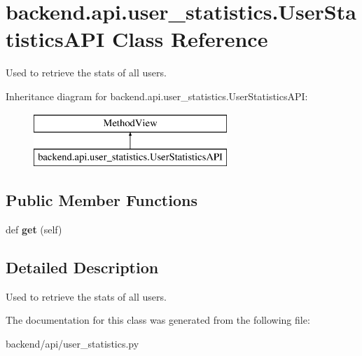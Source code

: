 \hypertarget{classbackend_1_1api_1_1user__statistics_1_1_user_statistics_a_p_i}{}\section{backend.\+api.\+user\+\_\+statistics.\+User\+Statistics\+A\+P\+I Class Reference}
\label{classbackend_1_1api_1_1user__statistics_1_1_user_statistics_a_p_i}


Used to retrieve the stats of all users.  


Inheritance diagram for backend.\+api.\+user\+\_\+statistics.\+User\+Statistics\+A\+P\+I\+:\begin{figure}[H]
\begin{center}
\leavevmode
\includegraphics[height=2.000000cm]{classbackend_1_1api_1_1user__statistics_1_1_user_statistics_a_p_i}
\end{center}
\end{figure}
\subsection*{Public Member Functions}
\begin{DoxyCompactItemize}
\item 
\hypertarget{classbackend_1_1api_1_1user__statistics_1_1_user_statistics_a_p_i_a586567d5b1630e27a41bb7a66c4564ff}{}def {\bfseries get} (self)\label{classbackend_1_1api_1_1user__statistics_1_1_user_statistics_a_p_i_a586567d5b1630e27a41bb7a66c4564ff}

\end{DoxyCompactItemize}


\subsection{Detailed Description}
Used to retrieve the stats of all users. 

The documentation for this class was generated from the following file\+:\begin{DoxyCompactItemize}
\item 
backend/api/user\+\_\+statistics.\+py\end{DoxyCompactItemize}
